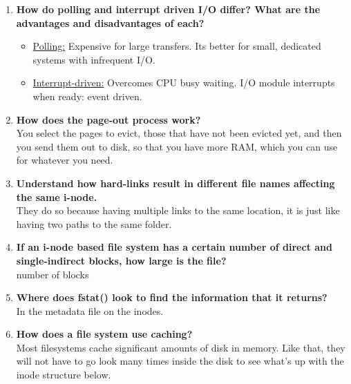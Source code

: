 \documentclass[a4paper]{article}
\begin{document}
\begin{enumerate}
  \item {\bf How do polling and interrupt driven I/O differ?  What are the advantages and disadvantages of each? }\\
    \begin{itemize}
      \item \underline{Polling:} Expensive for large transfers. Its better for small, dedicated systems with infrequent I/O.
      \item \underline{Interrupt-driven:} Overcomes CPU busy waiting. I/O module interrupts when ready: event driven. 
    \end{itemize}

  \item {\bf How does the page-out process work? }\\
    You select the pages to evict, those that have not been evicted yet, and then you send them out to disk, so that you have more RAM, which you can use for whatever you need.

  \item {\bf Understand how hard-links result in different file names affecting the same i-node. }\\
    They do so because having multiple links to the same location, it is just like having two paths to the same folder.

  \item {\bf If an i-node based file system has a certain number of direct and single-indirect blocks, how large is the file? }\\
    number of blocks 
  \item {\bf Where does fstat() look to find the information that it returns? }\\
    In the metadata file on the inodes.

  \item {\bf How does a file system use caching? }\\
    Most filesystems cache significant amounts of disk in memory. Like that, they will not have to go look many times inside the disk to see what's up with the inode structure below.
    
\end{enumerate}
\end{document}
